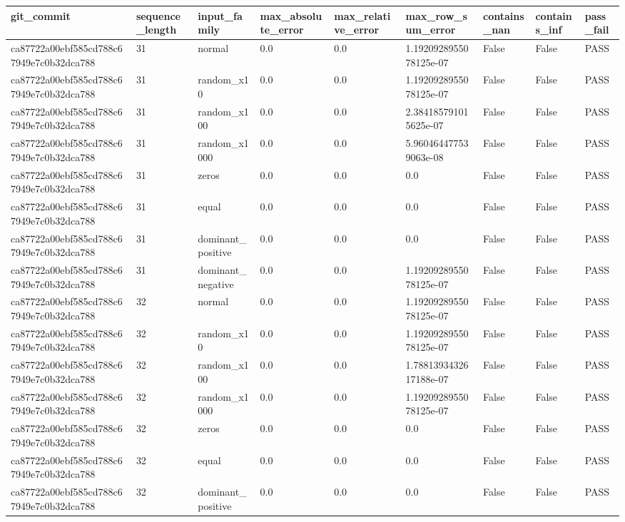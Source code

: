 \begin{tabular}{lllllllll}
\hline
git\_commit & sequence\_length & input\_family & max\_absolute\_error & max\_relative\_error & max\_row\_sum\_error & contains\_nan & contains\_inf & pass\_fail \\
\hline
ca87722a00ebf585cd788c67949e7c0b32dca788 & 31 & normal & 0.0 & 0.0 & 1.1920928955078125e-07 & False & False & PASS \\
ca87722a00ebf585cd788c67949e7c0b32dca788 & 31 & random\_x10 & 0.0 & 0.0 & 1.1920928955078125e-07 & False & False & PASS \\
ca87722a00ebf585cd788c67949e7c0b32dca788 & 31 & random\_x100 & 0.0 & 0.0 & 2.384185791015625e-07 & False & False & PASS \\
ca87722a00ebf585cd788c67949e7c0b32dca788 & 31 & random\_x1000 & 0.0 & 0.0 & 5.960464477539063e-08 & False & False & PASS \\
ca87722a00ebf585cd788c67949e7c0b32dca788 & 31 & zeros & 0.0 & 0.0 & 0.0 & False & False & PASS \\
ca87722a00ebf585cd788c67949e7c0b32dca788 & 31 & equal & 0.0 & 0.0 & 0.0 & False & False & PASS \\
ca87722a00ebf585cd788c67949e7c0b32dca788 & 31 & dominant\_positive & 0.0 & 0.0 & 0.0 & False & False & PASS \\
ca87722a00ebf585cd788c67949e7c0b32dca788 & 31 & dominant\_negative & 0.0 & 0.0 & 1.1920928955078125e-07 & False & False & PASS \\
ca87722a00ebf585cd788c67949e7c0b32dca788 & 32 & normal & 0.0 & 0.0 & 1.1920928955078125e-07 & False & False & PASS \\
ca87722a00ebf585cd788c67949e7c0b32dca788 & 32 & random\_x10 & 0.0 & 0.0 & 1.1920928955078125e-07 & False & False & PASS \\
ca87722a00ebf585cd788c67949e7c0b32dca788 & 32 & random\_x100 & 0.0 & 0.0 & 1.7881393432617188e-07 & False & False & PASS \\
ca87722a00ebf585cd788c67949e7c0b32dca788 & 32 & random\_x1000 & 0.0 & 0.0 & 1.1920928955078125e-07 & False & False & PASS \\
ca87722a00ebf585cd788c67949e7c0b32dca788 & 32 & zeros & 0.0 & 0.0 & 0.0 & False & False & PASS \\
ca87722a00ebf585cd788c67949e7c0b32dca788 & 32 & equal & 0.0 & 0.0 & 0.0 & False & False & PASS \\
ca87722a00ebf585cd788c67949e7c0b32dca788 & 32 & dominant\_positive & 0.0 & 0.0 & 0.0 & False & False & PASS \\

\end{tabular}
